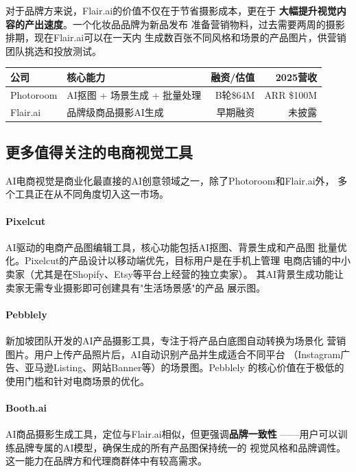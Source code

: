 对于品牌方来说，Flair.ai的价值不仅在于节省摄影成本，更在于
\textbf{大幅提升视觉内容的产出速度}。一个化妆品品牌为新品发布
准备营销物料，过去需要两周的摄影排期，现在Flair.ai可以在一天内
生成数百张不同风格和场景的产品图片，供营销团队挑选和投放测试。

\begin{keybox}
\small
\begin{tabularx}{\textwidth}{l X r r}
\toprule
\rowcolor{figLightGray}
\textbf{公司} & \textbf{核心能力} & \textbf{融资/估值} & \textbf{2025营收} \\
\midrule
Photoroom  & AI抠图 + 场景生成 + 批量处理  & B轮\$64M & ARR \$100M \\
Flair.ai   & 品牌级商品摄影AI生成          & 早期融资 & 未披露 \\
\bottomrule
\end{tabularx}
\end{keybox}

\subsection{更多值得关注的电商视觉工具}

AI电商视觉是商业化最直接的AI创意领域之一，除了Photoroom和Flair.ai外，
多个工具正在从不同角度切入这一市场。

\paragraph{Pixelcut}
AI驱动的电商产品图编辑工具，核心功能包括AI抠图、背景生成和产品图
批量优化。Pixelcut的产品设计以移动端优先，目标用户是在手机上管理
电商店铺的中小卖家（尤其是在Shopify、Etsy等平台上经营的独立卖家）。
其AI背景生成功能让卖家无需专业摄影即可创建具有"生活场景感"的产品
展示图。

\paragraph{Pebblely}
新加坡团队开发的AI产品摄影工具，专注于将产品白底图自动转换为场景化
营销图片。用户上传产品照片后，AI自动识别产品并生成适合不同平台
（Instagram广告、亚马逊Listing、网站Banner等）的场景图。Pebblely
的核心价值在于极低的使用门槛和针对电商场景的优化。

\paragraph{Booth.ai}
AI商品摄影生成工具，定位与Flair.ai相似，但更强调\textbf{品牌一致性}
——用户可以训练品牌专属的AI模型，确保生成的所有产品图保持统一的
视觉风格和品牌调性。这一能力在品牌方和代理商群体中有较高需求。

